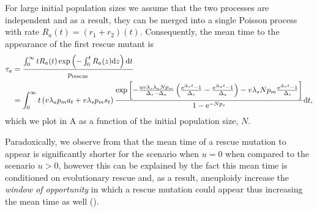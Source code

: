 \documentclass[12pt]{extarticle}
\renewcommand{\d}[1]{\ensuremath{\operatorname{d}\!{#1}}}
\renewcommand{\d}{{\rm d}}
\newcommand{\e}{{\rm e}}
\newcommand{\presc}{p_\text{rescue}}
\begin{document}
\begin{appendices}
For large initial population sizes we assume that the two processes are independent and as a result, they can be merged into a single Poisson process with rate $R_a(t)=\left(r_1+r_2\right)\left(t\right)$.
Consequently, the mean time to the appearance of the first rescue mutant is
\begin{align}\nonumber
\tau_a &= \frac{\int_{0}^{\infty}{tR_a(t)\exp\left(-\int_0^{t}{R_a(z)\d z}\right) \d t}}{\presc}\\ \label{meantimet2}
&=
\int_0^\infty t\left(v\lambda_ap_ma_t+v\lambda_sp_ms_t\right)\frac{\exp\left[-\frac{uv\lambda_s\lambda_aNp_m}{\Delta_s-\Delta_a}\left(\frac{\e^{\Delta_s t}-1}{\Delta_s}-\frac{\e^{\Delta_a t}-1}{\Delta_a}\right)-v\lambda_sNp_m\frac{\e^{\Delta_s t}-1}{\Delta_s}\right] }{1-\e^{-Np_s}}\d t,
\end{align}
which we plot in A as a function of the initial population size, $N$.

Paradoxically, we observe from  that the mean time of a rescue mutation to appear is significantly shorter for the scenario when $u=0$ when compared to the scenario $u>0$, however this can be explained by the fact this mean time is conditioned on evolutionary rescue and, as a result, aneuploidy increase the \emph{window of opportunity} in which a rescue mutation could appear thus increasing the mean time as well ().


\end{appendices}
\end{document}
